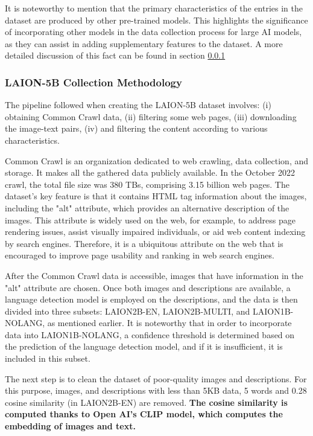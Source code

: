 It is noteworthy to mention that the primary characteristics of the entries in the dataset are produced by other pre-trained models. This highlights the significance of incorporating other models in the data collection process for large AI models, as they can assist in adding supplementary features to the dataset. A more detailed discussion of this fact can be found in section \ref{LCollection}

\subsubsection{LAION-5B Collection Methodology} \label{LCollection}

The pipeline followed when creating the LAION-5B dataset involves: (i) obtaining Common Crawl data, (ii) filtering some web pages, (iii) downloading the image-text pairs, (iv) and filtering the content according to various characteristics.

Common Crawl is an organization dedicated to web crawling, data collection, and storage. It makes all the gathered data publicly available. In the October 2022 crawl, the total file size was 380 TBs, comprising 3.15 billion web pages. The dataset's key feature is that it contains HTML tag information about the images, including the "alt" attribute, which provides an alternative description of the images. This attribute is widely used on the web, for example, to address page rendering issues, assist visually impaired individuals, or aid web content indexing by search engines. Therefore, it is a ubiquitous attribute on the web that is encouraged to improve page usability and ranking in web search engines.

After the Common Crawl data is accessible, images that have information in the "alt" attribute are chosen. Once both images and descriptions are available, a language detection model is employed on the descriptions, and the data is then divided into three subsets: LAION2B-EN, LAION2B-MULTI, and LAION1B-NOLANG, as mentioned earlier. It is noteworthy that in order to incorporate data into LAION1B-NOLANG, a confidence threshold is determined based on the prediction of the language detection model, and if it is insufficient, it is included in this subset.

The next step is to clean the dataset of poor-quality images and descriptions. For this purpose, images, and descriptions with less than 5KB data, 5 words and 0.28 cosine similarity (in LAION2B-EN) are removed. \textbf{The cosine similarity is computed thanks to Open AI's CLIP model, which computes the embedding of images and text.}

